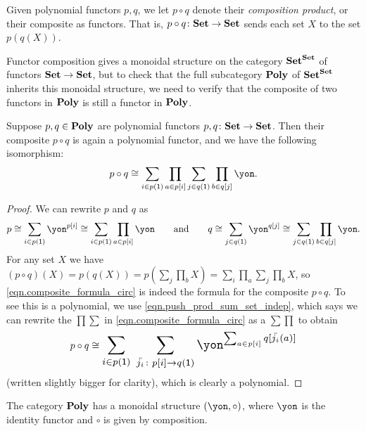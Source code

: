 \documentclass[Book-Poly]{subfiles}
\begin{document}
\begin{definition} \label{def.comp}
Given polynomial functors $p, q$, we let $p \circ q$ denote their \emph{composition product}, or their composite as functors.
That is, $p \circ q \colon \mathbf{Set} \to \mathbf{Set}$ sends each set $X$ to the set $p(q(X))$.
\end{definition}

Functor composition gives a monoidal structure on the category $\mathbf{Set}^{\mathbf{Set}}$ of functors $\mathbf{Set}\to\mathbf{Set}$, but to check that the full subcategory $\mathbf{Poly}$ of $\mathbf{Set}^{\mathbf{Set}}$ inherits this monoidal structure, we need to verify that the composite of two functors in $\mathbf{Poly}$ is still a functor in $\mathbf{Poly}$.

\begin{proposition}\label{prop.poly_closed_comp}
Suppose $p,q\in\mathbf{Poly}$ are polynomial functors $p,q\colon\mathbf{Set}\to\mathbf{Set}$. Then their composite $p\circ q$ is again a polynomial functor, and we have the following isomorphism:
\begin{equation} \label{eqn.composite_formula_circ}
p\circ q\iso\sum_{i\in p(\1)}\prod_{a\in p[i]}\sum_{j\in q(\1)}\prod_{b\in q[j]}\yon.
\end{equation}
\end{proposition}
\begin{proof}
We can rewrite $p$ and $q$ as
\[
p\iso\sum_{i\in p(\1)}\yon^{p[i]}\iso\sum_{i\in p(\1)}\prod_{a\in p[i]}\yon
\qqand
q\iso\sum_{j\in q(\1)}\yon^{q[j]}\iso\sum_{j\in q(\1)}\prod_{b\in q[j]}\yon.
\]
For any set $X$ we have $(p\circ q)(X)=p(q(X))=p(\sum_j\prod_b X)=\sum_i\prod_a\sum_j\prod_bX$, so \eqref{eqn.composite_formula_circ} is indeed the formula for the composite $p \circ q$.
To see this is a polynomial, we use \eqref{eqn.push_prod_sum_set_indep}, which says we can rewrite the $\prod\sum$ in \eqref{eqn.composite_formula_circ} as a $\sum\prod$ to obtain
\begin{align}\label{eqn.composite_formula_sums_first_circ}
  p\circ q\iso
  \scalebox{1.3}{$\displaystyle
  \sum_{i\in p(\1)} \; \sum_{\bar{j_i}\colon p[i]\to q(\1)}\yon^{\sum_{a\in p[i]}q[\bar{j_i}(a)]}$}
\end{align}
(written slightly bigger for clarity), which is clearly a polynomial.
\end{proof}

\begin{corollary} \label{cor.comp_monoidal}
The category $\mathbf{Poly}$ has a monoidal structure $(\yon,\circ)$, where $\yon$ is the identity functor and $\circ$ is given by composition.
\end{corollary}
\end{document}
